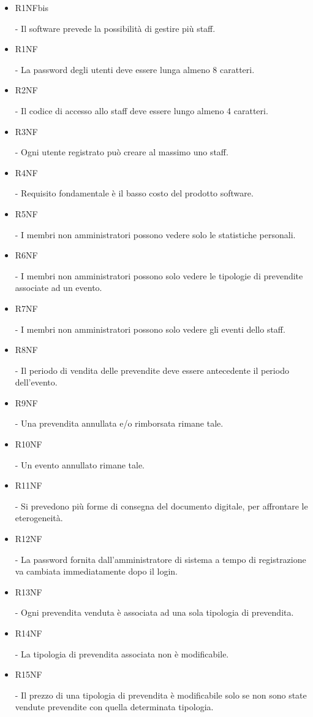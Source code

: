 \documentclass[a4paper]{article}
\begin{document}
\begin{itemize}
    \item \hypertarget{R1NFbis}{R1NFbis} - Il software prevede la possibilità di gestire più staff.
    \item \hypertarget{R1NF}{R1NF} - La password degli utenti deve essere lunga almeno 8 caratteri.
	\item \hypertarget{R2NF}{R2NF} - Il codice di accesso allo staff deve essere lungo almeno 4 caratteri.
	\item \hypertarget{R3NF}{R3NF} - Ogni utente registrato può creare al massimo uno staff.
	\item \hypertarget{R4NF}{R4NF} - Requisito fondamentale è il basso costo del prodotto software.
	
	\item \hypertarget{R5NF}{R5NF} - I membri non amministratori possono vedere solo le statistiche personali.	
	\item \hypertarget{R6NF}{R6NF} - I membri non amministratori possono solo vedere le tipologie di prevendite associate ad un evento.
	\item \hypertarget{R7NF}{R7NF} - I membri non amministratori possono solo vedere gli eventi dello staff.
	\item \hypertarget{R8NF}{R8NF} - Il periodo di vendita delle prevendite deve essere antecedente il periodo dell'evento.
	\item \hypertarget{R9NF}{R9NF} - Una prevendita annullata e/o rimborsata rimane tale.
	\item \hypertarget{R10NF}{R10NF} - Un evento annullato rimane tale.
	\item \hypertarget{R11NF}{R11NF} - Si prevedono più forme di consegna del documento digitale, per affrontare le eterogeneità.
	\item \hypertarget{R12NF}{R12NF} - La password fornita dall'amministratore di sistema a tempo di registrazione va cambiata immediatamente dopo il login.
	
	\item \hypertarget{R13NF}{R13NF} - Ogni prevendita venduta è associata ad una sola tipologia di prevendita.
	\item \hypertarget{R14NF}{R14NF} - La tipologia di prevendita associata non è modificabile.
	
	\item \hypertarget{R15NF}{R15NF} - Il prezzo di una tipologia di prevendita è modificabile solo se non sono state vendute prevendite con quella determinata tipologia.
	

\end{itemize}
\end{document}
